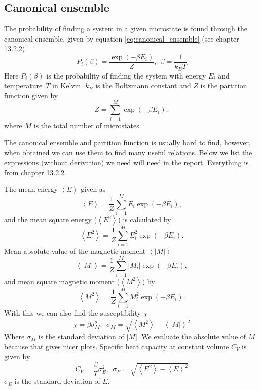 \documentclass[reprint, english,notitlepage,nofootinbib]{revtex4-1}  %
\begin{document}
\subsection*{Canonical ensemble}
The probability of finding a system in a given microstate is found through the canonical ensemble, given by equation \eqref{eq:canonical_ensemble} (see \cite{lectures2015} chapter 13.2.2).
\begin{equation}
	\label{eq:canonical_ensemble}
	P_i(\beta) = \frac{\exp(-\beta E_i)}{Z},\ \ \beta = \frac{1}{k_BT}
\end{equation}
Here $P_i(\beta)$ is the probability of finding the system with energy $E_i$ and temperature $T$ in Kelvin. $k_B$ is the Boltzmann constant and $Z$ is the partition function given by
\begin{equation}
	\label{eq:partition_function}
	Z = \sum_{i = 1}^{M}\exp(-\beta E_i),
\end{equation}
where $M$ is the total number of microstates.

The canonical ensemble and partition function is usually hard to find, however, when obtained we can use them to find many useful relations. Below we list the expressions (without derivation) we need will need in the report. Everything is from \cite{lectures2015} chapter 13.2.2.

The mean energy $\left<E\right>$ given as
\begin{equation}
	\label{eq:expected_energy}
	\left<E\right> = \frac{1}{Z} \sum_{i=1}^{M}E_i\exp(-\beta E_i),
\end{equation}
and the mean square energy ($\left<E^2\right>$) is calculated by
\begin{equation}
	\label{eq:expected_energy_sq}
	\left<E^2\right> = \frac{1}{Z} \sum_{i=1}^{M}E_i^2\exp(-\beta E_i).
\end{equation}
Mean absolute value of the magnetic moment $\left<|M|\right>$
\begin{equation}
	\label{eq:expected_magnetic_moment}
	\left<|M|\right> = \frac{1}{Z} \sum_{i=1}^{M}|M_i|\exp(-\beta E_i),
\end{equation}
and mean square magnetic moment ($\left<M^2\right>$) by
\begin{equation}
\label{eq:expected_magnetic_moment_sq}
\left<M^2\right> = \frac{1}{Z} \sum_{i=1}^{M}M_i^2\exp(-\beta E_i).
\end{equation}
With this we can also find the susceptibility $\chi$
\begin{equation}
	\label{eq:magnetic_susceptibility}
	\chi = \beta \sigma^2_M, \ \ \sigma_M = \sqrt{\left<M^2\right> - \left<|M|\right>^2}
\end{equation}
Where $\sigma_M$ is the standard deviation of $|M|$. We evaluate the absolute value of $M$ because that gives nicer plots. Specific heat capacity at constant volume $C_V$ is given by
\begin{equation}
	\label{eq:specific_heat_capacity}
	C_V = \frac{\beta}{T}\sigma^2_E, \ \ \sigma_E = \sqrt{\left<E^2\right> - \left<E\right>^2}
\end{equation}
$\sigma_E$ is the standard deviation of $E$.
\end{document}
